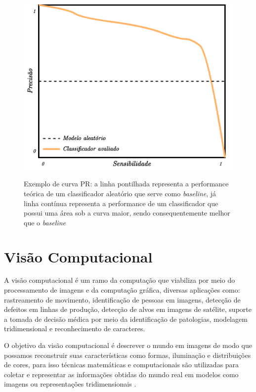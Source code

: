 \begin{figure}[htbp]
	\centering
	\caption{Exemplo de curva PR: a linha pontilhada representa a performance teórica de um classificador aleatório que serve como \textit{baseline}, já linha contínua representa a performance de um classificador que possui uma área sob a curva maior, sendo consequentemente melhor que o \textit{baseline}}
		\includegraphics[scale=.20]{imagens/prcurve.png}
	\label{fig:prcurve}
\end{figure}



\section{Visão Computacional}

A visão computacional é um ramo da computação que viabiliza por meio do processamento de imagens e da computação gráfica, diversas aplicações como: rastreamento de movimento, identificação de pessoas em imagens, detecção de defeitos em linhas de produção, detecção de alvos em imagens de satélite, suporte a tomada de decisão médica por meio da identificação de patologias, modelagem tridimensional e reconhecimento de caracteres. 

O objetivo da visão computacional é descrever o mundo em imagens de modo que possamos reconstruir suas características como formas, iluminação e distribuições de cores, para isso técnicas matemáticas e computacionais são utilizadas para coletar e representar as informações obtidas do mundo real em modelos como imagens ou representações tridimensionais \cite{szeliskiComputerVisionAlgorithms2011}.

